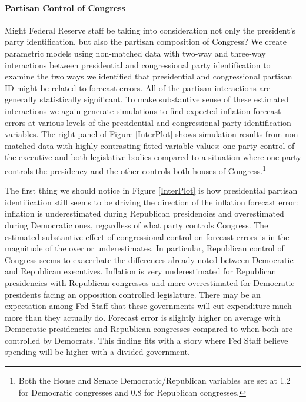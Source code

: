 \documentclass[a4paper]{article}\usepackage{graphicx, color}
\begin{document}
\paragraph{Partisan Control of Congress}

Might Federal Reserve staff be taking into consideration not only the president's party identification, but also the partisan composition of Congress?  We create parametric models using non-matched data with two-way and three-way interactions between presidential and congressional party identification to examine the two ways we identified that presidential and congressional partisan ID might be related to forecast errors. All of the partisan interactions are generally statistically significant. To make substantive sense of these estimated interactions we again generate simulations to find expected inflation forecast errors at various levels of the presidential and congressional party identification variables. The right-panel of Figure \ref{InterPlot} shows simulation results from non-matched data with highly contrasting fitted variable values: one party control of the executive and both legislative bodies compared to a situation where one party controls the presidency and the other controls both houses of Congress.\footnote{Both the House and Senate Democratic/Republican variables are set at 1.2 for Democratic congresses and 0.8 for Republican congresses.} 

The first thing we should notice in Figure \ref{InterPlot} is how presidential partisan identification still seems to be driving the direction of the inflation forecast error: inflation is underestimated during Republican presidencies and overestimated during Democratic ones, regardless of what party controls Congress. The estimated substantive effect of congressional control on forecast errors is in the magnitude of the over or underestimates. In particular, Republican control of Congress seems to exacerbate the differences already noted between Democratic and Republican executives. Inflation is very underestimated for Republican presidencies with Republican congresses and more overestimated for Democratic presidents facing an opposition controlled legislature. There may be an expectation among Fed Staff that these governments will cut expenditure much more than they actually do. Forecast error is slightly higher on average with Democratic presidencies and Republican congresses compared to when both are controlled by Democrats. This finding fits with a story where Fed Staff believe spending will be higher with a divided government. 
\end{document}
